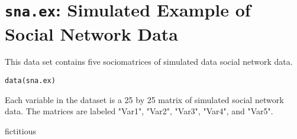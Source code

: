  \section{{\tt sna.ex}: Simulated Example of Social Network Data}\label{ss:sna.ex}
\begin{Description}\relax
This data set contains five sociomatrices of simulated data social network data.
\end{Description}
\begin{Usage}
\begin{verbatim}data(sna.ex)\end{verbatim}
\end{Usage}
\begin{Format}\relax
Each variable in the dataset is a 25 by 25 matrix of simulated social network data. The matrices are labeled "Var1", "Var2", "Var3", "Var4", and "Var5".
\end{Format}
\begin{Source}\relax
fictitious
\end{Source}


